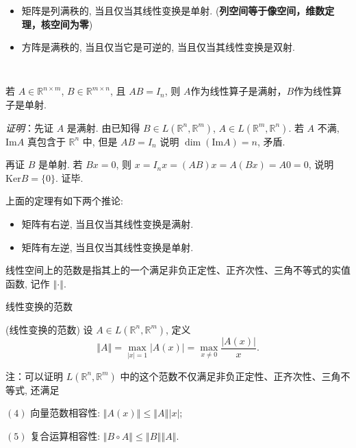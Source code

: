 \begin{itemize}
\item 矩阵是列满秩的, 当且仅当其线性变换是单射. (\textbf{列空间等于像空间，维数定理，核空间为零})
\end{itemize}

\begin{itemize}
\item 方阵是满秩的, 当且仅当它是可逆的, 当且仅当其线性变换是双射. \end{itemize}
\verb| |

\begin{theorem}{}
若 $A\in\mathbb{R}^{n\times m}$, $B\in\mathbb{R}^{m\times n}$, 且 $AB=I_n$, 则 $A$作为线性算子是满射，$B$作为线性算子是单射.

\textsl{证明}：先证 $A$ 是满射. 由已知得 $B\in L(\mathbb{R}^{n},\mathbb{R}^{m})$, $A\in L(\mathbb{R}^{m},\mathbb{R}^{n})$.
若 $A$ 不满, $\mathrm{Im}A$ 真包含于 $\mathbb{R}^{n}$ 中, 但是 $AB=I_{n}$
说明 $\dim(\mathrm{Im}A)=n$, 矛盾. 

再证 $B$ 是单射. 若 $Bx=0$, 则 $x=I_{n}x=(AB)x=A(Bx)=A0=0$, 说明 $\mathrm{Ker}B=\{0\}$.
证毕. 
\end{theorem}

上面的定理有如下两个推论:

\begin{itemize}
\item 矩阵有右逆, 当且仅当其线性变换是满射. \end{itemize}

\begin{itemize}
\item 矩阵有左逆, 当且仅当其线性变换是单射. 
\end{itemize}

线性空间上的范数是指其上的一个满足非负正定性、正齐次性、三角不等式的实值函数, 记作 $\left\Vert \cdot\right\Vert $. 

线性变换的范数

\begin{definition}{(线性变换的范数)}
设 $A\in L(\mathbb{R}^{n},\mathbb{R}^{m})$, 定义
\[
\left\Vert A\right\Vert =\max_{|x|=1}|A(x)|=\max_{x\neq0}{\displaystyle \frac{|A(x)|}{x}}.
\]
\end{definition}
注：可以证明 $L(\mathbb{R}^{n},\mathbb{R}^{m})$ 中的这个范数不仅满足非负正定性、正齐次性、三角不等式,
还满足

$(4)$ 向量范数相容性: $\left\Vert A(x)\right\Vert \leqslant\left\Vert A\right\Vert \left|x\right|$;

$(5)$ 复合运算相容性: $\left\Vert B\circ A\right\Vert \leqslant\left\Vert B\right\Vert \left\Vert A\right\Vert $.



